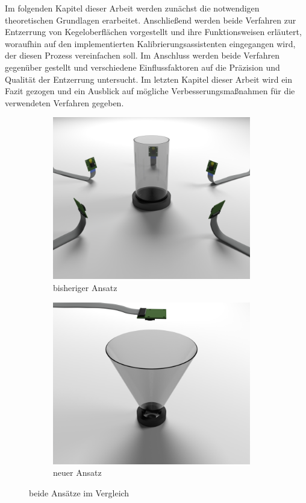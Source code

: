 Im folgenden Kapitel dieser Arbeit werden zunächst die notwendigen theoretischen Grundlagen erarbeitet.
Anschließend werden beide Verfahren zur Entzerrung von Kegeloberflächen vorgestellt und ihre Funktionsweisen erläutert, woraufhin auf den implementierten Kalibrierungsassistenten eingegangen wird, der diesen Prozess vereinfachen soll.
Im Anschluss werden beide Verfahren gegenüber gestellt und verschiedene Einflussfaktoren auf die Präzision und Qualität der Entzerrung untersucht. 
Im letzten Kapitel dieser Arbeit wird ein Fazit gezogen und ein Ausblick auf mögliche Verbesserungsmaßnahmen für die verwendeten Verfahren gegeben.



\begin{figure}[!htb]
	\centering
	\begin{subfigure}{.5\textwidth}
		\centering
		\includegraphics[width=0.95\textwidth]{images/renderCylinder.png}
		\caption{bisheriger Ansatz}
		\label{fig:oldSetup}
	\end{subfigure}%
	\begin{subfigure}{.5\textwidth}
		\centering
		\includegraphics[width=0.95\textwidth]{images/renderCone.png}
		\caption{neuer Ansatz}
		\label{fig:newSetup}
	\end{subfigure}
	\caption{beide Ansätze im Vergleich}
	\label{fig:renderedSetup}
\end{figure}
